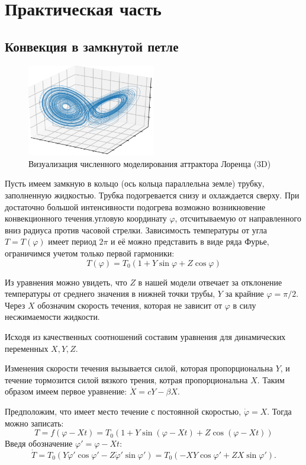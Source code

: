 \section{Практическая часть}

\subsection{Конвекция в замкнутой петле}

\begin{figure}[h]
    \centering
    \includegraphics[width=0.5\textwidth]{img/attr_L.png}
    \caption{Визуализация численного моделирования аттрактора Лоренца (3D)}
    \label{fig:att_L}
\end{figure}

Пусть имеем замкную в кольцо (ось кольца параллельна земле) трубку, заполненную жидкостью. Трубка подогревается снизу и охлаждается сверху.
При достаточно большой интенсивности подогрева возможно возникновение конвекционного течения.угловую координату $\varphi$, отсчитываемую от направленного вниз радиуса против часовой стрелки. 
Зависимость температуры от угла $T = T(\varphi)$ имеет период $2 \pi$ и её можно представить в виде ряда Фурье, ограничимся учетом только первой гармоники: 
$$T(\varphi) = T_0(1 + Y \sin \varphi + Z \cos \varphi)$$

Из уравнения можно увидеть, что $Z$ в нашей модели отвечает за отклонение температуры от среднего значения в нижней точки трубы, $Y$ за крайние $\varphi = \pi/2$.
Через $X$ обозначим скорость течения, которая не зависит от $\varphi$ в силу несжимаемости жидкости.

Исходя из качественных соотношений составим уравнения для динамических переменных $X, Y, Z$.

Изменения скорости течения вызывается силой, которая пропорциональна $Y$, и течение тормозится силой вязкого трения, котрая пропорциональна $X$. Таким образом имеем первое уравнение: $\dot{X} = c Y - \beta X$.

Предположим, что имеет место течение с постоянной скоростью, $\dot{\varphi} = X$. Тогда можно записать:
$$T = f(\varphi - X t) = T_0(1 + Y \sin (\varphi - X t) + Z \cos(\varphi - X t))$$
Введя обозначение $\varphi' = \varphi - X t$:
$$\dot{T} = T_0(Y \dot{\varphi}' \cos \varphi' - Z \dot{\varphi}' \sin{\varphi'}) = T_0(- X Y \cos \varphi' + Z X \sin \varphi').$$

